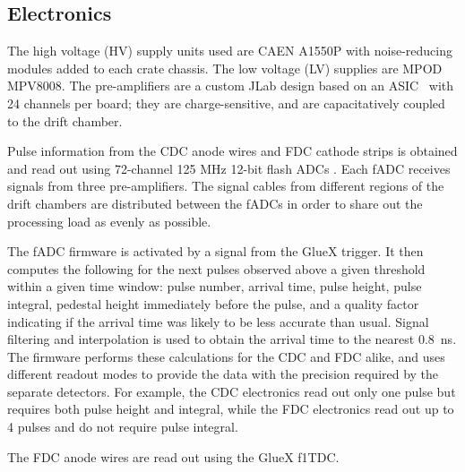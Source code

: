 \subsection{Electronics \label{sec:dcelectronics}}
The high voltage (HV) supply units used are CAEN A1550P with noise-reducing modules added to each crate chassis. 
The low voltage (LV) supplies are MPOD MPV8008. 
The pre-amplifiers are a custom JLab design based on an ASIC~\cite{Barbosa2008}
with 24 channels per board; they are charge-sensitive, and are capacitatively coupled to the drift chamber. 

Pulse information from the CDC anode wires and FDC cathode strips is obtained and read out using 72-channel 125 MHz 12-bit flash ADCs \cite{Visser2008,5873864}. 
Each fADC receives signals from three pre-amplifiers. 
The signal cables from different regions of the drift chambers are distributed between the fADCs in order to share out the processing load as evenly as possible.  

The fADC firmware is activated by a signal from the GlueX trigger. It then computes the following for the next pulses observed above a given threshold within a given time window: pulse number, arrival time, pulse height, pulse integral, pedestal height immediately before the pulse, and a quality factor indicating if the arrival time was likely to be less accurate than usual. 
Signal filtering and interpolation is used to obtain the arrival time to the nearest 0.8~ns. 
The firmware performs these calculations for the CDC and FDC alike, and uses different readout modes to provide the data with the precision required by the separate detectors. 
For example, the CDC electronics read out only one pulse but requires both pulse height and integral, while the FDC electronics read out up to 4 pulses and do not require pulse integral.  


The FDC anode wires are read out using the GlueX f1TDC\cite{JLAB2002}. 



